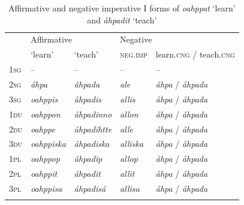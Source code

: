 \documentclass[output=paper,colorlinks,citecolor=brown]{langscibook}
\begin{document}
\begin{table}

\begin{tabularx}{\textwidth}{llX ll}
\lsptoprule
& \multicolumn{2}{l}{Affirmative} & \multicolumn{2}{l}{Negative} \\
& {‘learn’} & {‘teach’} & {\textsc{neg.imp}} & {learn.\textsc{cng} / teach.\textsc{cng}}\\
\midrule
{\textsc{1sg}} & {–} & {–} & {–} & {–} \\
{\textsc{2sg}} & {\itshape åhpa} & {\textit{åhpada}} & {\textit{ale}} & {\textit{åhpa} / \textit{åhpada}}\\
{\textsc{3sg}} & {\itshape oahppis} & {\textit{åhpadis}} & {\textit{allis}} & {\textit{åhpa} / \textit{åhpada}}\\
{\textsc{1du}} & {\itshape oahppon} & {\textit{åhpadinno}} & {\textit{allon}} & {\textit{åhpa} / \textit{åhpada}}\\
{\textsc{2du}} & {\itshape oahppe} & {\textit{åhpadihtte}} & {\textit{alle}} & {\textit{åhpa} / \textit{åhpada}}\\
{\textsc{3du}} & {\itshape oahppiska} & {\textit{åhpadiska}} & {\textit{alliska}} & {\textit{åhpa} / \textit{åhpada}}\\
{\textsc{1pl}} & {\itshape oahppop} & {\textit{åhpadip}} & {\textit{allop}} & {\textit{åhpa} / \textit{åhpada}}\\
{\textsc{2pl}} & {\itshape oahppit} & {\itshape åhpadit} & {\textit{allit}} & {\textit{åhpa} / \textit{åhpada}}\\
{\textsc{3pl}} & {\itshape oahppisa} & {\textit{åhpadisá}} & {\textit{allisa}} & {\textit{åhpa} / \textit{åhpada}}\\
\lspbottomrule
\end{tabularx}
    \caption{Affirmative and negative imperative I forms of \textit{oahppat} ‘learn’ and \textit{åhpadit} ‘teach’}
    \label{tab:lul:4}
\end{table}
\end{document}
